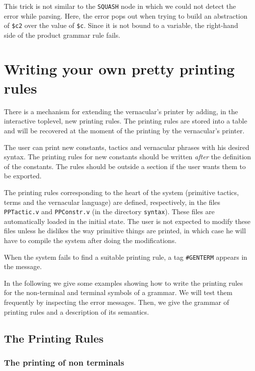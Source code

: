 \noindent This trick is not similar to the {\tt SQUASH} node in which
we could not detect the error while parsing. Here, the error pops out
when trying to build an abstraction of {\tt\$c2} over the value of
{\tt\$c}. Since it is not bound to a variable, the right-hand side of
the product grammar rule fails.
 
\section{Writing your own pretty printing rules}
\label{Syntax}

There is a mechanism for extending the
vernacular's printer by adding, in the interactive
toplevel, new printing rules.  The printing rules are stored into a
table and will be recovered at the moment of the printing by the
vernacular's printer.

The user can print new constants, tactics and vernacular phrases
with his desired syntax.  The printing rules
for new constants should be written {\em after} the definition of the
constants. The rules should be
outside a section if the user wants them to be exported.

The printing rules corresponding to the heart of the system (primitive
tactics, terms and the vernacular language) are defined,
respectively, in the files {\tt PPTactic.v} and {\tt PPConstr.v}
(in the directory {\tt syntax}). These files are automatically
loaded in the initial state. The user is not expected to modify these
files unless he dislikes the way primitive things are printed, in
which case he will have to compile the system after doing the
modifications.

When the system fails to find a suitable printing rule, a tag
\verb+#GENTERM+ appears in the message.

In the following we give some examples showing how to write the
printing rules for the non-terminal and terminal symbols of a
grammar. We will test them frequently by inspecting the error
messages.  Then, we give the grammar of printing rules and a
description of its semantics.


\subsection{The Printing Rules}
\subsubsection{The printing of non terminals}

